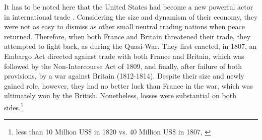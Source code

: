 \documentclass[12pt,a4paper,notitlepage,english]{article}
\begin{document}
\begin{appendix}
It has to be noted here that the United States had become a new powerful actor in international trade \citep{Cuenca-Esteban2014}. Considering the size and dynamism of their economy, they were not as easy to dismiss as other small neutral trading nations when peace returned.
Therefore, when both France and Britain threatened their trade, they attempted to fight back, as during the Quasi-War.
They first enacted, in 1807, an Embargo Act directed against trade with both France and Britain, which was followed by the Non-Intercourse Act of 1809, and finally, after failure of both provisions, by a war against Britain (1812-1814). 
Despite their size and newly gained role, however, they had no better luck than France in the war, which was ultimately won by the British.
Nonetheless, losses were substantial on both sides.\footnote{less than 10 Million US\$ in 1820 vs. 40 Million US\$ in 1807, \citep[tables A-4 and B-2]{North1960}}


\end{appendix}
\end{document}
